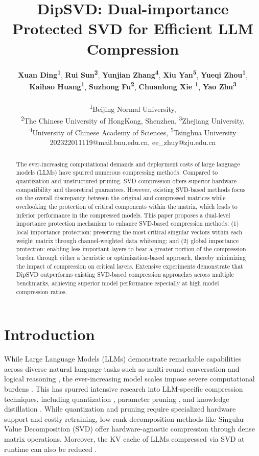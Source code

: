 \documentclass[11pt]{article}
\title{DipSVD: Dual-importance Protected SVD for Efficient LLM Compression}
\author{
 \textbf{Xuan Ding\textsuperscript{1}},
 \textbf{Rui Sun\textsuperscript{2}},
 \textbf{Yunjian Zhang\textsuperscript{4}},
 \textbf{Xiu Yan\textsuperscript{5}},
 \textbf{Yueqi Zhou\textsuperscript{1}},
\\
 \textbf{Kaihao Huang\textsuperscript{1}},
 \textbf{Suzhong Fu\textsuperscript{2}},
 \textbf{Chuanlong Xie \textsuperscript{1}},
 \textbf{Yao Zhu\textsuperscript{3}}
\\
\\
 \textsuperscript{1}Beijing Normal University, \\
 \textsuperscript{2}The Chinese University of HongKong, Shenzhen,
 \textsuperscript{3}Zhejiang University, \\
 \textsuperscript{4}University of Chinese Academy of Sciences,
 \textsuperscript{5}Tsinghua University
\\
 \small{
   202322011119@mail.bnu.edu.cn, ee\_zhuy@zju.edu.cn
 }
}
\begin{document}
\maketitle
\begin{abstract}
The ever-increasing computational demands and deployment costs of large language models (LLMs) have spurred numerous compressing methods. Compared to quantization and unstructured pruning, SVD compression offers superior hardware compatibility and theoretical guarantees. However, existing SVD-based methods focus on the overall discrepancy between the original and compressed matrices while overlooking the protection of critical components within the matrix, which leads to inferior performance in the compressed models. This paper proposes a dual-level importance protection mechanism to enhance SVD-based compression methods: (1) local importance protection: preserving the most critical singular vectors within each weight matrix through channel-weighted data whitening; and (2) global importance protection: enabling less important layers to bear a greater portion of the compression burden through either a heuristic or optimization-based approach, thereby minimizing the impact of compression on critical layers. Extensive experiments demonstrate that DipSVD outperforms existing SVD-based compression approaches across multiple benchmarks, achieving superior model performance especially at high model compression ratios.
\end{abstract}

\section{Introduction}

While Large Language Models (LLMs) demonstrate remarkable capabilities across diverse natural language tasks such as multi-round conversation \citep{chen2023chatcot, long2023large} and logical reasoning \citep{creswell2022selection, duan2024gtbench, pan2023logic},  the ever-increasing model scales impose severe computational burdens \citep{zhou2024survey, wang2024iot}.  This has spurred intensive research into LLM-specific compression techniques, including quantization \citep{frantar2022gptq,lin2024awq}, parameter pruning \citep{men2024shortgpt, ma2023llm, kim2024shortened, song2024sleb,ding2025sliding}, and knowledge distillation \citep{gu2023minillm,hsieh2023distilling}. While quantization and pruning require specialized hardware support and costly retraining, low-rank decomposition methods like Singular Value Decomposition (SVD) offer hardware-agnostic compression through dense matrix operations. Moreover, the KV cache of LLMs compressed via SVD at runtime can also be reduced \citep{wang2024svd}.
\end{document}
